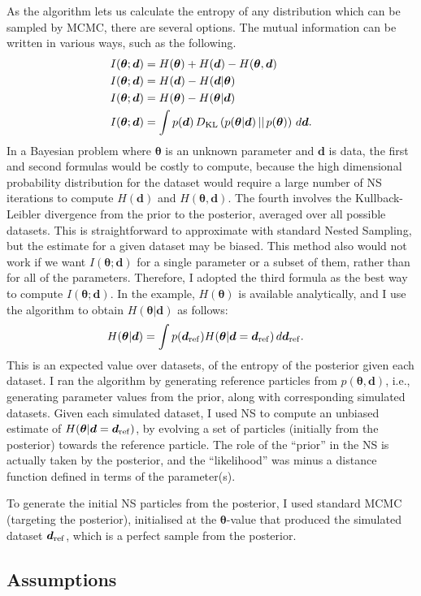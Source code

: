 \documentclass[entropy,article,accept,oneauthor,pdftex,10pt,a4paper]{mdpi}
\renewcommand{\d}{\boldsymbol{d}}
\newcommand{\x}{\boldsymbol{\theta}}
\begin{document}
As the algorithm lets us calculate the entropy of any distribution which can
be sampled by MCMC, there are several options. The mutual information
can be written in various ways, such as the following.
\begin{align}
I(\x; \d) &= H(\x) + H(\d) - H(\x, \d) \\
I(\x; \d) &= H(\d) - H(\d|\x) \\
I(\x; \d) &= H(\x) - H(\x|\d) \\
I(\x; \d) &= \int p(\d) \, D_{\rm KL}\left(p(\x|\d) \,||\, p(\x)\right) \, d\d.
\end{align}
In a Bayesian problem where $\x$ is an unknown parameter and $\d$ is data, the
first and second formulas would be costly to compute, because the
high dimensional probability distribution for the dataset would require a
large number of NS iterations to compute $H(\d)$ and $H(\x, \d)$.
The fourth involves the Kullback-Leibler divergence from the prior to the
posterior, averaged over all possible datasets. This is straightforward to
approximate with standard Nested Sampling, but the estimate for a given dataset
may be biased. This method also would not work if we want $I(\x; \d)$ for
a single parameter or a subset of them, rather than for all of the parameters.
Therefore, I adopted the third formula as the best way to compute $I(\x; \d)$.
In the example, $H(\x)$ is available analytically, and I use the algorithm to
obtain $H(\x | \d)$ as follows:
\begin{align}
H(\x | \d) &= \int p(\d_{\rm ref}) H(\x | \d=\d_{\rm ref}) \, d\d_{\rm ref}.
\end{align}
This is an expected value over datasets, of the entropy of the posterior given
each dataset. I ran the algorithm by generating reference particles from
$p(\x, \d)$, i.e., generating parameter values from the prior, along with
corresponding simulated datasets. Given each simulated dataset, I used NS
to compute an unbiased estimate of $H(\x | \d=\d_{\rm ref})$, by evolving
a set of particles (initially from the posterior) towards the reference particle.
The role of the ``prior'' in the NS is actually taken by the posterior, and the
``likelihood'' was minus a distance function defined in terms of the
parameter(s).

To generate the initial
NS particles from the posterior, I used standard MCMC (targeting the
posterior), initialised at the $\x$-value that produced the simulated dataset
$\d_{\rm ref}$, which is a perfect sample from the posterior.

\subsection{Assumptions}
\end{document}
